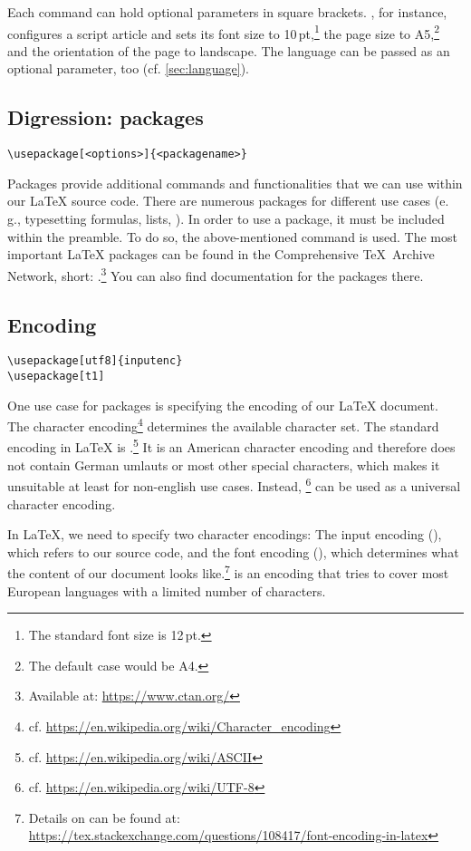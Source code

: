 Each  command can hold optional parameters in 
square brackets. 
, 
for instance, configures a  script article and sets its font size to 
10\,pt,\footnote{The standard font size is 12\,pt.} the page size to 
A5,\footnote{The default case would be A4.} and the orientation of the page to 
landscape. 
The language can be passed as an optional parameter, too (cf. \cref{sec:language}). 

\subsection{Digression: packages}
\label{sec:packages}

\begin{verbatim}
\usepackage[<options>]{<packagename>}
\end{verbatim}
Packages provide additional commands and functionalities that we can use within our \LaTeX{} source code. 
There are numerous packages for different use cases (e.\,g., typesetting formulas, lists, \textellipsis). 
In order to use a package, it must be included within the preamble. 
To do so, the above-mentioned command is used. 
The most important \LaTeX{} packages can be found in the Comprehensive \TeX\ Archive Network, short: .\footnote{Available at: \url{https://www.ctan.org/}} 
You can also find documentation for the packages there. 

\subsection{Encoding}
\begin{verbatim}
\usepackage[utf8]{inputenc}
\usepackage[t1]
\end{verbatim}
One use case for packages is specifying the encoding of our \LaTeX{} document. 
The character encoding\footnote{cf. \url{https://en.wikipedia.org/wiki/Character_encoding}} determines the available character set.
The standard encoding in \LaTeX{} is .\footnote{cf. \url{https://en.wikipedia.org/wiki/ASCII}}
It is an American character encoding and therefore does not contain German umlauts or most other special characters, which makes it unsuitable at least for non-english use cases. 
Instead, \footnote{cf. \url{https://en.wikipedia.org/wiki/UTF-8}} can be used as a universal character encoding.

In \LaTeX{}, we need to specify two character encodings: 
The input encoding (), which refers to our source code, and the font encoding (), which determines what the content of our  document looks like.\footnote{Details on  can be found at: \url{https://tex.stackexchange.com/questions/108417/font-encoding-in-latex}}
 is an encoding that tries to cover most European languages with a limited number of characters. 

